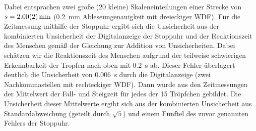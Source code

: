 \documentclass[
	a4paper,
	12pt,
	pagesize,
	ngerman
]{scrartcl}
\begin{document}
	Dabei entsprachen zwei große (20 kleine) Skaleneinteilungen  einer Strecke von $s = \SI{2\pm 0,02}{mm}$ (\SI{0,2}{mm} Ableseungenauigkeit mit dreieckiger WDF).
	Für die Zeitmessung mithilfe der Stoppuhr ergibt sich die Unsicherheit aus der kombinierten Unsicherheit der Digitalanzeige der Stoppuhr und der Reaktionszeit des Menschen gemäß der Gleichung zur Addition von Unsicherheiten.
	Dabei schätzen wir die Reaktionszeit des Menschen aufgrund der teilweise schwierigen Erkennbarkeit der Tropfen nach oben mit \SI{0.2}{s} ab.
	Dieser Fehler überlagert deutlich die Unsicherheit von \SI{0.006}{s} durch die Digitalanzeige (zwei Nachkommastellen mit rechteckiger WDF).
	Dann wurde aus den Zeitmessungen der Mittelwert der Fall- und Steigzeit für jedes der 15 Tröpfchen gebildet.
	Die Unsicherheit dieser Mittelwerte ergibt sich aus der kombinierten Unsicherheit aus Standardabweichung (geteilt durch $ \sqrt{5} $) und einem Fünftel des zuvor genannten Fehlers der Stoppuhr.
	
\end{document}
